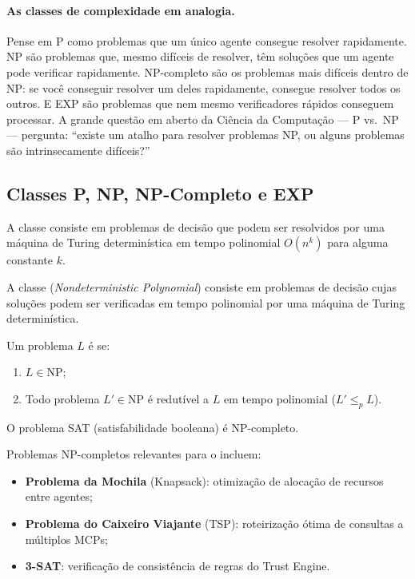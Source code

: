 \paragraph{As classes de complexidade em analogia.}
Pense em P como problemas que um único agente consegue resolver rapidamente.
NP são problemas que, mesmo difíceis de resolver, têm soluções que um agente
pode verificar rapidamente. NP-completo são os problemas mais difíceis dentro
de NP: se você conseguir resolver um deles rapidamente, consegue resolver
todos os outros. E EXP são problemas que nem mesmo verificadores rápidos
conseguem processar. A grande questão em aberto da Ciência da Computação ---
P vs.\ NP --- pergunta: ``existe um atalho para resolver problemas NP, ou
alguns problemas são intrinsecamente difíceis?''

\subsection{Classes P, NP, NP-Completo e EXP}

\begin{definicao}[Classe P]
    A classe  consiste em problemas de decisão que podem ser
    resolvidos por uma máquina de Turing determinística em tempo polinomial
    $O(n^k)$ para alguma constante $k$.
\end{definicao}

\begin{definicao}[Classe NP]
    A classe  (\textit{Nondeterministic Polynomial}) consiste
    em problemas de decisão cujas soluções podem ser verificadas em tempo
    polinomial por uma máquina de Turing determinística.
\end{definicao}

\begin{definicao}[NP-completude]
    Um problema $L$ é  se:
    \begin{enumerate}
        \item $L \in \text{NP}$;
        \item Todo problema $L' \in \text{NP}$ é redutível a $L$ em tempo
              polinomial ($L' \leq_p L$).
    \end{enumerate}
\end{definicao}

\begin{teorema}
    O problema SAT (satisfabilidade booleana) é NP-completo.
\end{teorema}

\begin{exemplo}
    Problemas NP-completos relevantes para o \opencodeeco{} incluem:
    \begin{itemize}
        \item \textbf{Problema da Mochila} (Knapsack): otimização de alocação
              de recursos entre agentes;
        \item \textbf{Problema do Caixeiro Viajante} (TSP): roteirização
              ótima de consultas a múltiplos MCPs;
        \item \textbf{3-SAT}: verificação de consistência de regras do
              Trust Engine.
    \end{itemize}
\end{exemplo}


